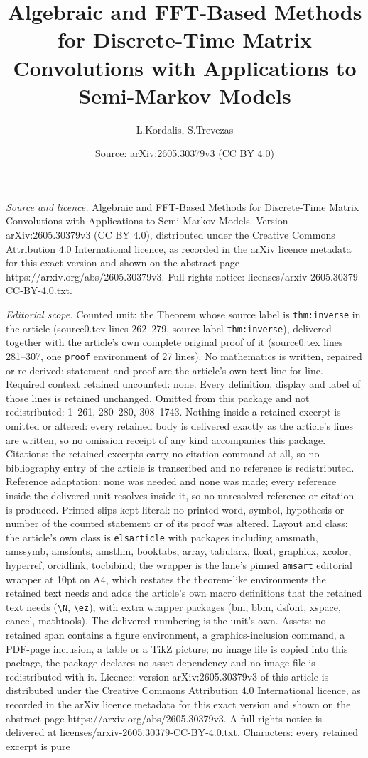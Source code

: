\documentclass[10pt,a4paper]{amsart}
\title[Algebraic and FFT-Based Methods for Discrete-Time Matrix Con]{Algebraic and FFT-Based Methods for Discrete-Time Matrix Convolutions with Applications to Semi-Markov Models}
\author{L.Kordalis, S.Trevezas}
\date{Source: arXiv:2605.30379v3 (CC BY 4.0)}
\begin{document}
\maketitle

\noindent\emph{Source and licence.} Algebraic and FFT-Based Methods for Discrete-Time Matrix Convolutions with Applications to Semi-Markov Models. Version arXiv:2605.30379v3 (CC BY 4.0), distributed under the Creative Commons Attribution 4.0 International licence, as recorded in the arXiv licence metadata for this exact version and shown on the abstract page https://arxiv.org/abs/2605.30379v3. Full rights notice: licenses/arxiv-2605.30379-CC-BY-4.0.txt.\par\smallskip

\noindent\textit{Editorial scope.} Counted unit: the Theorem whose source label is \texttt{thm:inverse} in the article (source0.tex lines 262--279, source label \texttt{thm:inverse}), delivered together with the article's own complete original proof of it (source0.tex lines 281--307, one \texttt{proof} environment of 27 lines). No mathematics is written, repaired or re-derived: statement and proof are the article's own text line for line. Required context retained uncounted: none. Every definition, display and label of those lines is retained unchanged. Omitted from this package and not redistributed: 1--261, 280--280, 308--1743. Nothing inside a retained excerpt is omitted or altered: every retained body is delivered exactly as the article's lines are written, so no omission receipt of any kind accompanies this package. Citations: the retained excerpts carry no citation command at all, so no bibliography entry of the article is transcribed and no reference is redistributed. Reference adaptation: none was needed and none was made; every reference inside the delivered unit resolves inside it, so no unresolved reference or citation is produced. Printed slips kept literal: no printed word, symbol, hypothesis or number of the counted statement or of its proof was altered. Layout and class: the article's own class is \texttt{elsarticle} with packages including amsmath, amssymb, amsfonts, amsthm, booktabs, array, tabularx, float, graphicx, xcolor, hyperref, orcidlink, tocbibind; the wrapper is the lane's pinned \texttt{amsart} editorial wrapper at 10pt on A4, which restates the theorem-like environments the retained text needs and adds the article's own macro definitions that the retained text needs (\texttt{\textbackslash N}, \texttt{\textbackslash ez}), with extra wrapper packages (bm, bbm, dsfont, xspace, cancel, mathtools). The delivered numbering is the unit's own. Assets: no retained span contains a figure environment, a graphics-inclusion command, a PDF-page inclusion, a table or a TikZ picture; no image file is copied into this package, the package declares no asset dependency and no image file is redistributed with it. Licence: version arXiv:2605.30379v3 of this article is distributed under the Creative Commons Attribution 4.0 International licence, as recorded in the arXiv licence metadata for this exact version and shown on the abstract page https://arxiv.org/abs/2605.30379v3. A full rights notice is delivered at licenses/arxiv-2605.30379-CC-BY-4.0.txt. Characters: every retained excerpt is pure 
\end{document}
